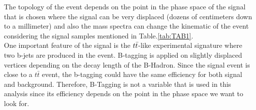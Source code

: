 \documentclass{cernatlasnote}
\begin{document}
The topology of the event depends on the point in the phase space of the signal that is chosen where the signal can be very displaced (dozens of centimeters down to a millimeter) and also the mass spectra can change the kinematic of the event considering the signal samples mentioned in Table.\ref{tab:TAB1}.\\
One important feature of the signal is the $t\Bar{t}$-like experimental signature where two b-jets are produced in the event. B-tagging is applied on slightly displaced vertices \cite{CMS-DP-2018-058} depending on the decay length of the B-Hadron. Since the signal event is close to a $t\bar{t}$ event, the b-tagging could have the same efficiency for both signal and background.
Therefore, B-Tagging is not a variable that is used in this analysis since its efficiency depends on the point in the phase space we want to look for.\\


\end{document}
